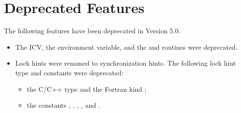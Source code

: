 \section{Deprecated Features}
\label{chap:Deprecated Features}

The following features have been deprecated in Version 5.0.

\begin{itemize}
\item The  ICV, the  environment variable, and
      the  and  routines were deprecated.

\item Lock hints were renamed to synchronization hints. The following lock hint 
      type and constants were deprecated:

\begin{itemize}
\item the C/C++ type  and the Fortran kind
      ;

\item the constants ,
      , ,
      , and .
\end{itemize}
\end{itemize}



